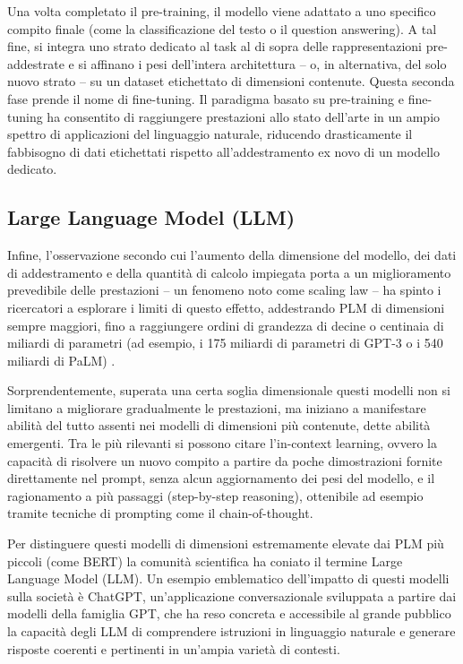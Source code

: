 Una volta completato il pre-training, il modello viene adattato a uno specifico compito finale (come la classificazione del testo o il question answering). A tal fine, si integra uno strato dedicato al task al di sopra delle rappresentazioni pre-addestrate e si affinano i pesi dell'intera architettura -- o, in alternativa, del solo nuovo strato -- su un dataset etichettato di dimensioni contenute. Questa seconda fase prende il nome di fine-tuning. Il paradigma basato su pre-training e fine-tuning ha consentito di raggiungere prestazioni allo stato dell'arte in un ampio spettro di applicazioni del linguaggio naturale, riducendo drasticamente il fabbisogno di dati etichettati rispetto all'addestramento ex novo di un modello dedicato.

\subsection{Large Language Model (LLM)}
Infine, l'osservazione secondo cui l'aumento della dimensione del modello, dei dati di addestramento e della quantità di calcolo impiegata porta a un miglioramento prevedibile delle prestazioni -- un fenomeno noto come scaling law -- ha spinto i ricercatori a esplorare i limiti di questo effetto, addestrando PLM di dimensioni sempre maggiori, fino a raggiungere ordini di grandezza di decine o centinaia di miliardi di parametri (ad esempio, i 175 miliardi di parametri di GPT-3 o i 540 miliardi di PaLM) \cite{zhao2023survey}.

Sorprendentemente, superata una certa soglia dimensionale questi modelli non si limitano a migliorare gradualmente le prestazioni, ma iniziano a manifestare abilità del tutto assenti nei modelli di dimensioni più contenute, dette abilità emergenti. Tra le più rilevanti si possono citare l'in-context learning, ovvero la capacità di risolvere un nuovo compito a partire da poche dimostrazioni fornite direttamente nel prompt, senza alcun aggiornamento dei pesi del modello, e il ragionamento a più passaggi (step-by-step reasoning), ottenibile ad esempio tramite tecniche di prompting come il chain-of-thought.

Per distinguere questi modelli di dimensioni estremamente elevate dai PLM più piccoli (come BERT) la comunità scientifica ha coniato il termine Large Language Model (LLM). Un esempio emblematico dell'impatto di questi modelli sulla società è ChatGPT, un'applicazione conversazionale sviluppata a partire dai modelli della famiglia GPT, che ha reso concreta e accessibile al grande pubblico la capacità degli LLM di comprendere istruzioni in linguaggio naturale e generare risposte coerenti e pertinenti in un'ampia varietà di contesti.






